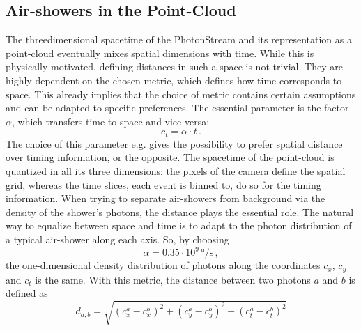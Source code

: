 \subsection{Air-showers in the Point-Cloud}
%
The threedimensional spacetime of the PhotonStream and its representation as a
point-cloud eventually mixes spatial dimensions with time. While this is
physically motivated, defining distances in such a space is not trivial. They
are highly dependent on the chosen metric, which defines how time corresponds to
space. This already implies that the choice of metric contains certain
assumptions and can be adapted to specific preferences. The essential parameter
is the factor $\alpha$, which transfers time to space and vice versa:
%
\begin{equation}
  c_{t} = \alpha \cdot t \, .
  \label{eq:metric}
\end{equation}
%
The choice of this parameter e.g. gives the possibility to prefer spatial
distance over timing information, or the opposite. The spacetime of the
point-cloud is quantized in all its three dimensions: the pixels of the camera
define the spatial grid, whereas the time slices, each event is binned to, do so
for the timing information. When trying to separate air-showers from
background via the density of the shower's photons, the distance plays the
essential role. The natural way to equalize between space and time is to adapt
to the photon distribution of a typical air-shower along each axis. So, by
choosing
%
\begin{equation}
  \alpha = 0.35\cdot10^9\,\si{\degree\per\second}\, ,
\end{equation}
%
the one-dimensional density distribution of photons along the coordinates
$c_x$, $c_y$ and $c_t$ is the same. With this metric, the distance between two
photons $a$ and $b$ is defined as
%
\begin{equation}
  d_{a,b} = \sqrt{(c_x^a - c_x^b)^2 + (c_y^a - c_y^b)^2 + (c_t^a - c_t^b)^2}
\end{equation}

